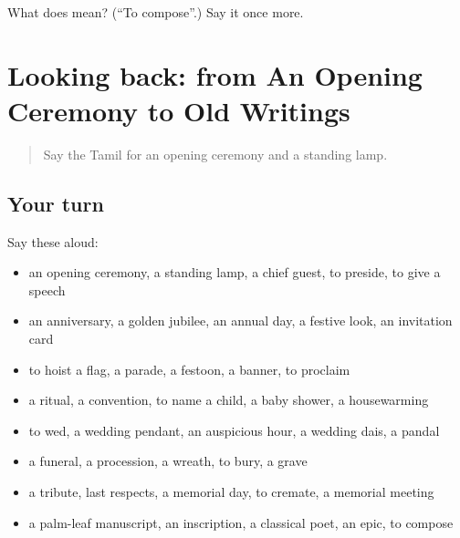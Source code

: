 \begin{tcolorbox}[breakable,colback=teal!4,colframe=teal!35!black,title={Before you move on}]
What does  mean? (\textquotedblleft{}To compose\textquotedblright{}.) Say it once more.
\end{tcolorbox}
\section[(dialogue)]{Looking back: from An Opening Ceremony to Old Writings}

\label{lesson:TA-R325-review-318-325}



\begin{quote}
Say the Tamil for an opening ceremony and a standing lamp.
\end{quote}

\subsection*{Your turn}
Say these aloud:

\begin{itemize}
\raggedright
  \item an opening ceremony, a standing lamp, a chief guest, to preside, to give a speech
  \item an anniversary, a golden jubilee, an annual day, a festive look, an invitation card
  \item to hoist a flag, a parade, a festoon, a banner, to proclaim
  \item a ritual, a convention, to name a child, a baby shower, a housewarming
  \item to wed, a wedding pendant, an auspicious hour, a wedding dais, a pandal
  \item a funeral, a procession, a wreath, to bury, a grave
  \item a tribute, last respects, a memorial day, to cremate, a memorial meeting
  \item a palm-leaf manuscript, an inscription, a classical poet, an epic, to compose
\end{itemize}


